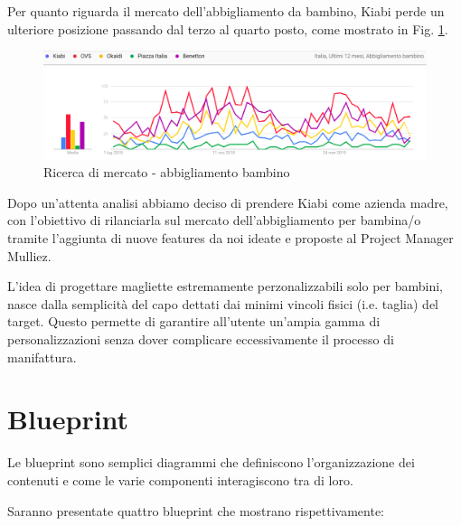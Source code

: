 \documentclass[12pt,italian,]{report}
\begin{document}
Per quanto riguarda il mercato dell'abbigliamento da bambino, Kiabi perde un ulteriore posizione passando dal terzo al quarto posto, come mostrato in Fig. \ref{abbigliamento_bambino}.

\begin{figure}[h]
\centering
\includegraphics{img/abbigliamento_bambino.png}
\caption{Ricerca di mercato - abbigliamento bambino}
\label{abbigliamento_bambino}
\end{figure}

Dopo un'attenta analisi abbiamo deciso di prendere Kiabi come azienda madre, con l'obiettivo di rilanciarla sul mercato dell'abbigliamento per bambina/o tramite l'aggiunta di nuove features da noi ideate e proposte al Project Manager Mulliez.

L'idea di progettare magliette estremamente perzonalizzabili solo per bambini, nasce dalla semplicità del capo dettati dai minimi vincoli fisici (i.e. taglia) del target. Questo permette di garantire all'utente un'ampia gamma di personalizzazioni senza dover complicare eccessivamente
il processo di manifattura.

\newpage
\section{Blueprint}\label{Blueprint}
Le blueprint sono semplici diagrammi che definiscono l'organizzazione dei contenuti e come le varie componenti interagiscono tra di loro.

Saranno presentate quattro blueprint che mostrano rispettivamente:
\end{document}
